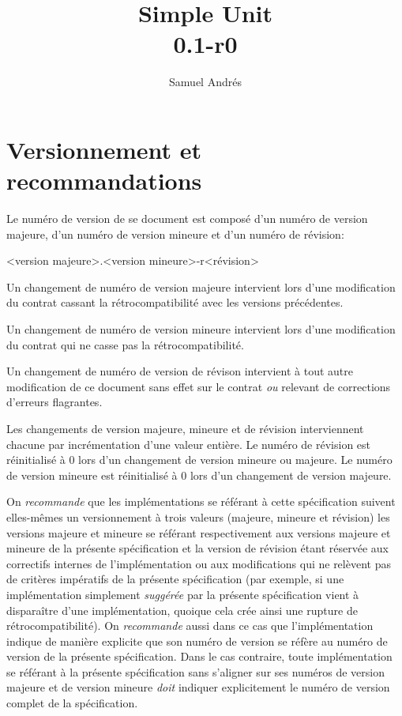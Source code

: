 \documentclass[a4paper,draft,twoside,10pt]{article}
\title{Simple Unit\\0.1-r0}
\author{Samuel Andrés}
\begin{document}
\maketitle

\section{Versionnement et recommandations}

Le numéro de version de se document est composé d'un numéro de version majeure, d'un numéro de version mineure et d'un
numéro de révision:

<version majeure>.<version mineure>-r<révision>

Un changement de numéro de version majeure intervient lors d'une modification du contrat cassant la rétrocompatibilité
avec les versions précédentes.

Un changement de numéro de version mineure intervient lors d'une modification du contrat qui ne casse pas la
rétrocompatibilité.

Un changement de numéro de version de révison intervient à tout autre modification de ce document sans effet sur le
contrat \emph{ou} relevant de corrections d'erreurs flagrantes.

Les changements de version majeure, mineure et de révision interviennent chacune par incrémentation d'une valeur
entière. Le numéro de révision est réinitialisé à 0 lors d'un changement de version mineure ou majeure. Le numéro de
version mineure est réinitialisé à 0 lors d'un changement de version majeure.

On \emph{recommande} que les implémentations se référant à cette spécification suivent elles-mêmes un versionnement à
trois valeurs (majeure, mineure et révision) les versions majeure et mineure se référant respectivement aux versions
majeure et mineure de la présente spécification et la version de révision étant réservée aux correctifs internes de
l'implémentation ou aux modifications qui ne relèvent pas de critères impératifs de la présente spécification (par
exemple, si une implémentation simplement \emph{suggérée} par la présente spécification vient à disparaître d'une
implémentation, quoique cela crée ainsi une rupture de rétrocompatibilité). On \emph{recommande} aussi dans ce cas que
l'implémentation indique de manière explicite que son numéro de version se réfère au numéro de version de la présente
spécification. Dans le cas contraire, toute implémentation se référant à la présente spécification sans s'aligner sur
ses numéros de version majeure et de version mineure \emph{doit} indiquer explicitement le numéro de version complet de
la spécification.
\end{document}
